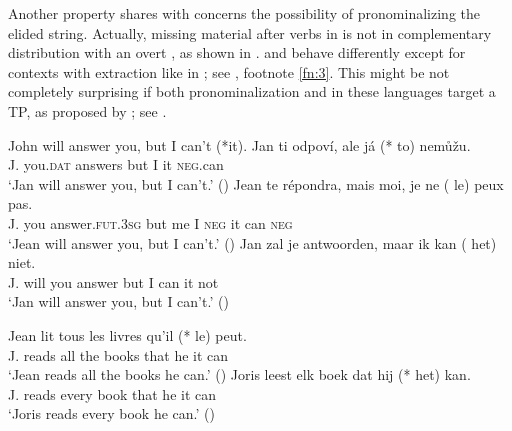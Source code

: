 \documentclass[output=paper,colorlinks,citecolor=brown,]{langsci/langscibook}
\begin{document}
\noindent Another property  shares with  concerns the possibility of pronominalizing the elided string. Actually, missing material after  verbs in  is not in complementary distribution with an overt , as shown in .  and  behave differently except for contexts with extraction like in ; see , footnote \ref{fn:3}. This might be not completely surprising if both pronominalization and  in these languages target a TP, as proposed by \citet{Dagnac2010}; see .


\begin{exe}
\ex \label{20}
\begin{xlist}
\ex \label{20a} John will answer you, but I can't (*it).
\ex \label{20b}
\gll Jan  ti    odpoví, ale  já (*\hspace{-2pt} to) nemůžu.\\
J.    you.\textsc{dat} answers but I       {} it   \textsc{neg}.can\\
\glt `Jan will answer you, but I can't.' \hfill ()
\ex \label{20c}
\gll   Jean te    répondra,  mais moi, je ne  (\hspace{-2pt} le) peux pas. \\
J.  you answer.\textsc{fut}.\textsc{3sg} but me I \textsc{neg} {} it can \textsc{neg}\\
\glt `Jean will answer you, but I can't.' \hfill ()
\ex \label{20d}
\gll  Jan zal je antwoorden, maar ik kan (\hspace{-2pt} het) niet.\\
J. will you answer but I can {} it not\\
\glt `Jan will answer you, but I can't.' \hfill ()
\end{xlist}
\ex \label{21}
\begin{xlist}
\ex \label{21a}
\gll  Jean  lit tous les livres  qu'il   (*\hspace{-2pt} le) peut.\\
J.  reads all  the books {that he}   {} it   can \\
\glt `Jean reads all the books he can.' \hfill ()
\ex \label{21b}
\gll  Joris leest  elk  boek dat hij (*\hspace{-2pt} het) kan.\\
J.   reads every book that he     {} it    can \\
\glt `Joris reads every book he can.' \hfill ()
\end{xlist}
\end{exe}
\end{document}
